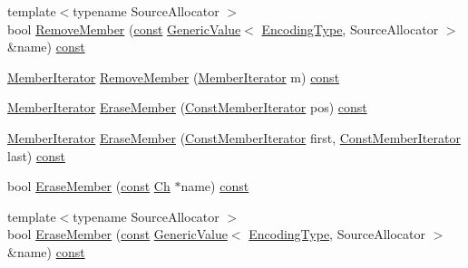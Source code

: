 \begin{DoxyCompactItemize}
\item 
{\footnotesize template$<$typename Source\+Allocator $>$ }\\bool \mbox{\hyperlink{classrapidjson_1_1_generic_object_af2fa07494d817effd1b50c0a84e442cf}{Remove\+Member}} (\mbox{\hyperlink{classrapidjson_1_1_generic_object_a3524fcb5f36c034aabd8afa19fc16d9e}{const}} \mbox{\hyperlink{classrapidjson_1_1_generic_value}{Generic\+Value}}$<$ \mbox{\hyperlink{classrapidjson_1_1_generic_object_ac412c8d073aa02f622b3904e4195425c}{Encoding\+Type}}, Source\+Allocator $>$ \&name) \mbox{\hyperlink{classrapidjson_1_1_generic_object_a3524fcb5f36c034aabd8afa19fc16d9e}{const}}
\item 
\mbox{\hyperlink{classrapidjson_1_1_generic_object_a598fd1d5f55289eca275847f0e8ef295}{Member\+Iterator}} \mbox{\hyperlink{classrapidjson_1_1_generic_object_a9227df396b62534391cd9a52ab7cdf37}{Remove\+Member}} (\mbox{\hyperlink{classrapidjson_1_1_generic_object_a598fd1d5f55289eca275847f0e8ef295}{Member\+Iterator}} m) \mbox{\hyperlink{classrapidjson_1_1_generic_object_a3524fcb5f36c034aabd8afa19fc16d9e}{const}}
\item 
\mbox{\hyperlink{classrapidjson_1_1_generic_object_a598fd1d5f55289eca275847f0e8ef295}{Member\+Iterator}} \mbox{\hyperlink{classrapidjson_1_1_generic_object_ad8569180721b7194fffb0f289c0f8956}{Erase\+Member}} (\mbox{\hyperlink{classrapidjson_1_1_generic_object_a579a7d7ab7102bcf86c948d0df3d2f2d}{Const\+Member\+Iterator}} pos) \mbox{\hyperlink{classrapidjson_1_1_generic_object_a3524fcb5f36c034aabd8afa19fc16d9e}{const}}
\item 
\mbox{\hyperlink{classrapidjson_1_1_generic_object_a598fd1d5f55289eca275847f0e8ef295}{Member\+Iterator}} \mbox{\hyperlink{classrapidjson_1_1_generic_object_af5d1661531777782d90249fe5ee748cb}{Erase\+Member}} (\mbox{\hyperlink{classrapidjson_1_1_generic_object_a579a7d7ab7102bcf86c948d0df3d2f2d}{Const\+Member\+Iterator}} first, \mbox{\hyperlink{classrapidjson_1_1_generic_object_a579a7d7ab7102bcf86c948d0df3d2f2d}{Const\+Member\+Iterator}} last) \mbox{\hyperlink{classrapidjson_1_1_generic_object_a3524fcb5f36c034aabd8afa19fc16d9e}{const}}
\item 
bool \mbox{\hyperlink{classrapidjson_1_1_generic_object_a1bdc4fd5a89c27b4e8aa5d7e39ece85b}{Erase\+Member}} (\mbox{\hyperlink{classrapidjson_1_1_generic_object_a3524fcb5f36c034aabd8afa19fc16d9e}{const}} \mbox{\hyperlink{classrapidjson_1_1_generic_object_a947f543afbdd5e6d1c5b2dd1fe5a6e60}{Ch}} $\ast$name) \mbox{\hyperlink{classrapidjson_1_1_generic_object_a3524fcb5f36c034aabd8afa19fc16d9e}{const}}
\item 
{\footnotesize template$<$typename Source\+Allocator $>$ }\\bool \mbox{\hyperlink{classrapidjson_1_1_generic_object_a5df619ffdefc3a7e1f6f7c2670c305f7}{Erase\+Member}} (\mbox{\hyperlink{classrapidjson_1_1_generic_object_a3524fcb5f36c034aabd8afa19fc16d9e}{const}} \mbox{\hyperlink{classrapidjson_1_1_generic_value}{Generic\+Value}}$<$ \mbox{\hyperlink{classrapidjson_1_1_generic_object_ac412c8d073aa02f622b3904e4195425c}{Encoding\+Type}}, Source\+Allocator $>$ \&name) \mbox{\hyperlink{classrapidjson_1_1_generic_object_a3524fcb5f36c034aabd8afa19fc16d9e}{const}}
\end{DoxyCompactItemize}
